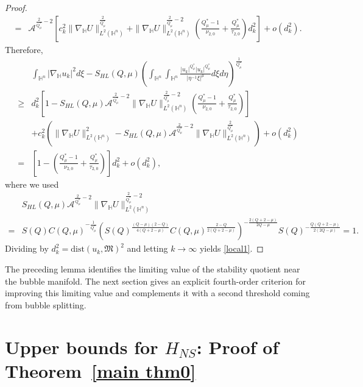 \documentclass[10pt,a4paper]{amsart}
\begin{document}
\begin{proof}
\begin{align*}
=& \mathcal{A}^{\frac{2}{Q^{\ast}_{\mu}}-2}
\left[c_k^{2} \|\nabla_\mathbb{H}U\|^{\frac{2}{Q^{\ast}_{\mu}}}_{L^{2}(\mathbb{H}^{n})}+\|\nabla_\mathbb{H}U\|^{\frac{2}{Q^{\ast}_{\mu}}-2}_{L^{2}(\mathbb{H}^{n})}
\left(\frac{Q^{\ast}_{\mu}-1}{\nu_{2,0}}+\frac{Q^{\ast}_{\mu}}{\tau_{2,0}}\right)d_k^2\right]+o(d_k^2).
 \end{align*}
{Therefore,}
 \begin{align*}
 & \int_{\mathbb{H}^{n}}|\nabla_{\mathbb{H}} u_k|^{2}{d}\xi-S_{HL}(Q,\mu) \left(\int_{\mathbb{H}^{n}}\int_{\mathbb{H}^{n}}\frac{|u_k|^{Q^{\ast}_{\mu}}|u_k|
^{Q^{\ast}_{\mu}}}{|\eta^{-1}\xi|^{\mu}}{d}\xi{d}\eta\right)^{\frac{1}{Q^{\ast}_{\mu}}}\\
\geq&
d_k^2\left[1-S_{HL}(Q,\mu)
\mathcal{A}^{\frac{2}{Q^{\ast}_{\mu}}-2} \|\nabla_\mathbb{H}U\|^{\frac{2}{Q^{\ast}_{\mu}}-2}_{L^{2}(\mathbb{H}^{n})}\left(\frac{Q^{\ast}_{\mu}-1}{\nu_{2,0}}+\frac{Q^{\ast}_{\mu}}{\tau_{2,0}}\right)\right]\\
&+c_k^2\left(\|\nabla_\mathbb{H}U\|^2_{{L}^{2}(\mathbb{H}^n)}-S_{HL}(Q,\mu)
\mathcal{A}^{\frac{2}{Q^{\ast}_{\mu}}-2} \|\nabla_\mathbb{H}U\|^{\frac{2}{Q^{\ast}_{\mu}}}_{L^{2}(\mathbb{H}^{n})}\right)+o(d_k^2)
\\
=&\left[1-\left(\frac{Q^{\ast}_{\mu}-1}{\nu_{2,0}}+\frac{Q^{\ast}_{\mu}}{\tau_{2,0}}\right)\right]d_k^2+o(d_k^2),
 \end{align*}
{where we used}
 \begin{align*}
 &S_{HL}(Q,\mu)\mathcal{A}^{\frac{2}{Q^{\ast}_{\mu}}-2} \|\nabla_\mathbb{H}U\|^{\frac{2}{Q^{\ast}_{\mu}}-2}_{L^{2}(\mathbb{H}^{n})}\\
 =&S(Q)C(Q,\mu)^{-\frac{1}{Q^{\ast}_{\mu}}}
 \left(S(Q)^{\frac{(Q-\mu)(2-Q)}{4(Q+2-\mu)}}C(Q,\mu)^{\frac{2-Q}{2(Q+2-\mu)}}\right)^{-\frac{2(Q+2-\mu)}{2Q-\mu}}
 S(Q)^{-\frac{Q(Q+2-\mu)}{2(2Q-\mu)}}=1.
 \end{align*}
{Dividing by $d_k^2=\mathrm{dist}(u_k,\mathfrak M)^2$ and letting $k\to\infty$ yields \eqref{local1}.}
\end{proof}



The preceding lemma identifies the limiting value of the stability quotient near the bubble manifold. The next section gives an explicit fourth-order criterion for improving this limiting value and complements it with a second threshold coming from bubble splitting.

\section{\texorpdfstring{{Upper bounds for $H_{NS}$: Proof of Theorem~\ref{main thm0}}}{Upper bounds for HNS: Proof of Theorem 3.1}}\label{sec4}
\end{document}
